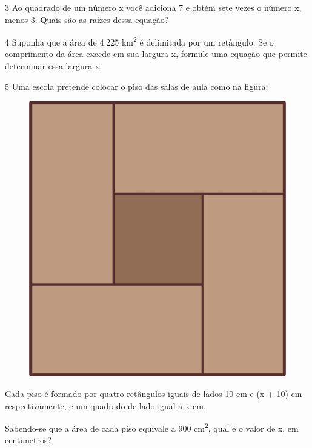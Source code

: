 \begin{emptybox}
\end{emptybox}

\num{3} Ao quadrado de um número x você adiciona 7 e obtém sete vezes o
número x, menos 3. Quais são as raízes dessa equação?

\begin{emptybox}
\end{emptybox}

\num{4} Suponha que a área de 4.225 km\textsuperscript{2} é delimitada por um
retângulo. Se o comprimento da área excede em sua largura x, formule uma 
equação que permite determinar essa largura x.

\begin{emptybox}
\end{emptybox}

\pagebreak
\num{5} Uma escola pretende colocar o piso das salas de aula como na
figura:

\begin{figure}[htpb!]
\centering
\includegraphics[width=.5\textwidth]{./ilustras-mat/modulo_7-atividade_5.png}
\end{figure}

Cada piso é formado por quatro retângulos iguais de lados 10 cm e (x +
10) cm respectivamente, e um quadrado de lado igual a x cm.

Sabendo-se que a área de cada piso equivale a 900 cm\textsuperscript{2},
qual é o valor de x, em centímetros?

